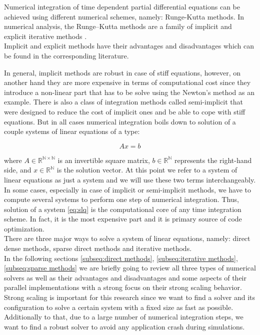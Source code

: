 Numerical integration of time dependent partial differential equations can be achieved using different numerical schemes, namely: Runge-Kutta methods. In numerical analysis, the Runge–Kutta methods are a family of implicit and explicit iterative methods \cite{wiki:runge-kutta}.  \\


Implicit and explicit methods have their advantages and disadvantages which can be found in the corresponding literature.

 In general, implicit methods are robust in case of stiff equations, however, on another hand they are more expensive in terms of computational cost since they introduce a non-linear part that has to be solve using the Newton's method as an example. There is also a class of integration methods called semi-implicit that were designed to reduce the cost of implicit ones and be able to cope with stiff equations. But in all cases numerical integration boils down to solution of a couple systems of linear equations of a type:

\begin{equation} \label{eq:slq}
	Ax = b
\end{equation}

 where $A \in \mathbb{R^{N \times N}}$ is an invertible square matrix, $b \in \mathbb{R^{N}}$ represents the right-hand side, and $x \in \mathbb{R^{N}}$ is the solution vector. At this point we refer to a system of linear equations as just a system and we will use these two terms interchangeably. \\
 
In some cases, especially in case of implicit or semi-implicit methods, we have to compute several systems to perform one step of numerical integration. Thus, solution of a system \ref{eq:slq} is the computational core of any time integration scheme. In fact, it is the most expensive part and it is primary source of code optimization. \\ 

There are three major ways to solve a system of linear equations, namely: direct dense methods, sparse direct methods and iterative methods.\\

In the following sections \ref{subseq:direct methods}, \ref{subseq:iterative methods}, \ref{subseq:sparse methods} we are briefly going to review all three types of numerical solvers as well as their advantages and disadvantages and some aspects of their parallel implementations with a strong focus on their strong scaling behavior. Strong scaling is important for this research since we want to find a solver and its configuration to solve a certain system with a fixed size as fast as possible. Additionally to that, due to a large number of numerical integration steps, we want to find a robust solver to avoid any application crash during simulations.

